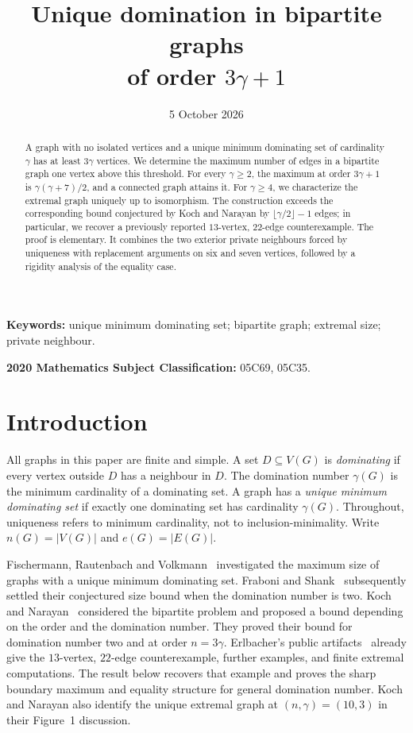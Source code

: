\documentclass[11pt]{article}
\title{Unique domination in bipartite graphs\\of order $3\gamma+1$}
\author{}
\date{5 October 2026}
\theoremstyle{definition}
\theoremstyle{remark}
\newcommand{\e}{e}
\begin{document}
\maketitle
\begin{abstract}
A graph with no isolated vertices and a unique minimum dominating set of
cardinality $\gamma$ has at least $3\gamma$ vertices. We determine the maximum
number of edges in a bipartite graph one vertex above this threshold. For every
$\gamma\ge2$, the maximum at order $3\gamma+1$ is $\gamma(\gamma+7)/2$, and a
connected graph attains it. For $\gamma\ge4$, we characterize the extremal graph
uniquely up to isomorphism. The construction exceeds the corresponding bound
conjectured by Koch and Narayan by $\lfloor\gamma/2\rfloor-1$ edges; in particular,
we recover a previously reported $13$-vertex, $22$-edge counterexample. The proof is elementary. It combines the two
exterior private neighbours forced by uniqueness with replacement arguments
on six and seven vertices, followed by a rigidity analysis of the equality case.
\end{abstract}
\noindent\textbf{Keywords:} unique minimum dominating set; bipartite graph;
extremal size; private neighbour.
\par\smallskip
\noindent\textbf{2020 Mathematics Subject Classification:} 05C69, 05C35.

\section{Introduction}

All graphs in this paper are finite and simple. A set $D\subseteq V(G)$ is
\emph{dominating} if every vertex outside $D$ has a neighbour in $D$.
The domination number $\gamma(G)$ is the minimum cardinality of a dominating
set. A graph has a \emph{unique minimum dominating set} if exactly one dominating
set has cardinality $\gamma(G)$. Throughout, uniqueness refers to minimum
cardinality, not to inclusion-minimality. Write $n(G)=|V(G)|$ and
$\e(G)=|E(G)|$.

Fischermann, Rautenbach and Volkmann~\cite{FRV} investigated the maximum size
of graphs with a unique minimum dominating set. Fraboni and Shank~\cite{FS}
subsequently settled their conjectured size bound when the domination number
is two. Koch and Narayan~\cite{KN} considered the bipartite problem and proposed
a bound depending on the order and the domination number. They proved their
bound for domination number two and at order $n=3\gamma$.
Erlbacher's public artifacts~\cite{E} already give the $13$-vertex, $22$-edge
counterexample, further examples, and finite extremal computations.
The result below recovers that example and proves the sharp boundary maximum
and equality structure for general domination number.
Koch and Narayan also identify the unique extremal graph at
$(n,\gamma)=(10,3)$ in their Figure~1 discussion.
\end{document}
